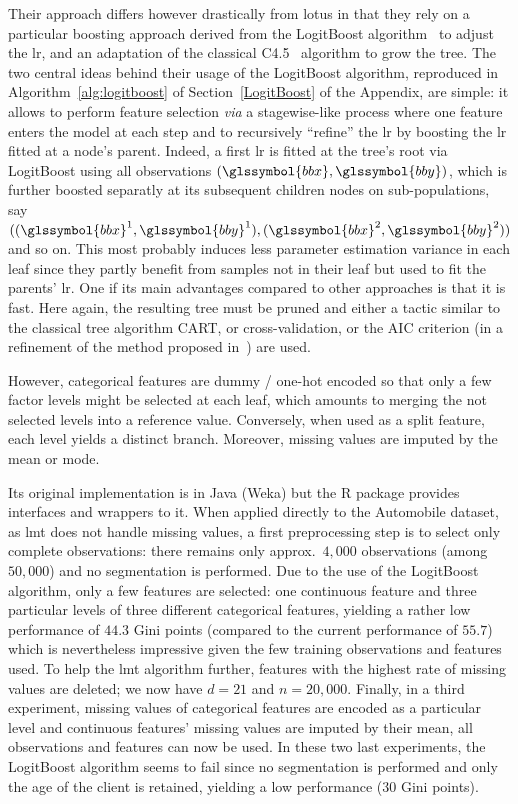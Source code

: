 Their approach differs however drastically from \gls{lotus} in that they rely on a particular boosting approach derived from the LogitBoost algorithm~\cite{friedman2000additive} to adjust the \gls{lr}, and an adaptation of the classical C4.5~\cite{quinlan2014c4} algorithm to grow the tree. The two central ideas behind their usage of the LogitBoost algorithm, reproduced in Algorithm~\ref{alg:logitboost} of Section~\ref{LogitBoost} of the Appendix, are simple: it allows to perform feature selection \textit{via} a stagewise-like process where one feature enters the model at each step and to recursively ``refine'' the \gls{lr} by boosting the \gls{lr} fitted at a node's parent. Indeed, a first \gls{lr} is fitted at the tree's root via LogitBoost using all observations $(\glssymbol{bbx},\glssymbol{bby})$, which is further boosted separatly at its subsequent children nodes on sub-populations, say $((\glssymbol{bbx}^1,\glssymbol{bby}^1), (\glssymbol{bbx}^2,\glssymbol{bby}^2))$ and so on. This most probably induces less parameter estimation variance in each leaf since they partly benefit from samples not in their leaf but used to fit the parents' \gls{lr}. One if its main advantages compared to other approaches is that it is fast. Here again, the resulting tree must be pruned and either a tactic similar to the classical tree algorithm CART, or cross-validation, or the AIC criterion (in a refinement of the method proposed in~\cite{sumner2005speeding}) are used.

However, categorical features are dummy / one-hot encoded so that only a few factor levels might be selected at each leaf, which amounts to merging the not selected levels into a reference value. Conversely, when used as a split feature, each level yields a distinct branch. Moreover, missing values are imputed by the mean or mode.

Its original implementation is in Java (Weka) but the \textsf{R} package  provides interfaces and wrappers to it. When applied directly to the Automobile dataset, as \gls{lmt} does not handle missing values, a first preprocessing step is to select only complete observations: there remains only approx.\ $4{,}000$ observations (among $50{,}000$) and no segmentation is performed. Due to the use of the LogitBoost algorithm, only a few features are selected: one continuous feature and three particular levels of three different categorical features, yielding a rather low performance of $44.3$ Gini points (compared to the current performance of $55.7$) which is nevertheless impressive given the few training observations and features used. To help the \gls{lmt} algorithm further, features with the highest rate of missing values are deleted; we now have $d = 21$ and $n = 20{,}000$. Finally, in a third experiment, missing values of categorical features are encoded as a particular level and continuous features' missing values are imputed by their mean, all observations and features can now be used. In these two last experiments, the LogitBoost algorithm seems to fail since no segmentation is performed and only the age of the client is retained, yielding a low performance ($30$ Gini points).

